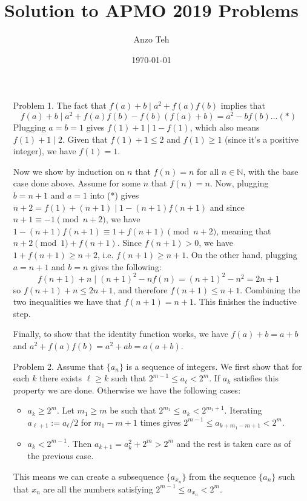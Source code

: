 \documentclass[11pt,a4paper]{article}
\begin{document}
\newcommand{\la}{\leftarrow}
\newcommand{\lra}{\leftrightarrow}
\newcommand{\bbN}{\mathbb{N}}
\newcommand{\bbZ}{\mathbb{Z}}
\newcommand{\dsum}{\displaystyle\sum}
\newcommand{\dprod}{\displaystyle\prod}


\title{Solution to APMO 2019 Problems}
\author{Anzo Teh}
\date{\today}
\maketitle

\begin{enumerate}
	\item [Problem 1.] The fact that $f(a)+b\mid a^2+f(a)f(b)$ implies that
	\[f(a)+b\mid a^2+f(a)f(b)-f(b)(f(a)+b)=a^2-bf(b)\dots (*)
	\] Plugging $a=b=1$ gives $f(1)+1\mid 1-f(1)$, which also means $f(1)+1\mid 2$. Given that $f(1)+1\le 2$ and $f(1)\ge 1$ (since it's a positive integer), we have $f(1)=1$. 
	
	Now we show by induction on $n$ that $f(n)=n$ for all $n\in\mathbb{N}$, with the base case done above. Assume for some $n$ that $f(n)=n$. 
	Now, plugging $b=n+1$ and $a=1$ into (*) gives $n+2=f(1)+(n+1)\mid 1-(n+1)f(n+1)$  and since $n+1\equiv -1\pmod{n+2}$, we have $1-(n+1)f(n+1)\equiv 1+f(n+1)\pmod{n+2}$, meaning that $n+2\pmod 1+f(n+1)$. 
	Since $f(n+1)>0$, we have $1+f(n+1)\ge n+2$, i.e. $f(n+1)\ge n+1$. 
	On the other hand, plugging $a=n+1$ and $b=n$ gives the following: 
	\[f(n+1)+n\mid (n+1)^2-nf(n)=(n+1)^2-n^2=2n+1
	\]
	so $f(n+1)+n\le 2n+1$, and therefore $f(n+1)\le n+1$. Combining the two inequalities we have that $f(n+1)=n+1$. This finishes the inductive step. 
	
	Finally, to show that the identity function works, we have $f(a)+b=a+b$ and $a^2+f(a)f(b)=a^2+ab=a(a+b)$. 
	
	\item [Problem 2.] Assume that $\{a_n\}$ is a sequence of integers. We first show that for each $k$ there exists $\ell\ge k$ such that $2^{m-1}\le a_{\ell}< 2^m$. If $a_k$ satisfies this property we are done. Otherwise we have the following cases: 
	\begin{itemize}
		\item $a_{k}\ge 2^m$. Let $m_1\ge m$ be such that $2^{m_1}\le a_k<2^{m_1+1}$. Iterating $a_{\ell+1}:=a_{\ell}/2$ for $m_1-m+1$ times gives $2^{m-1}\le a_{k+m_1-m+1}<2^m$. 
		
		\item $a_k < 2^{m-1}$. Then $a_{k+1}=a_k^2+2^m>2^m$ and the rest is taken care as of the previous case. 
	\end{itemize}
	This means we can create a subsequence $\{a_{x_n}\}$ from the sequence $\{a_n\}$ such that $x_n$ are all the numbers satisfying $2^{m-1}\le a_{x_n}<2^m$. 
	

\end{enumerate}
\end{document}
